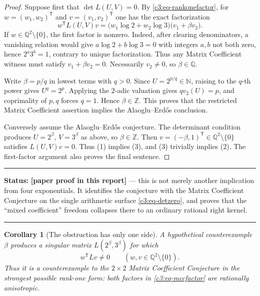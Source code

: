 \documentclass[11pt,oneside]{article}
\newtheorem{corollary}[theorem]{Corollary}
\theoremstyle{definition}
\theoremstyle{remark}
\newcommand{\N}{\mathbb N}
\newcommand{\Z}{\mathbb Z}
\newcommand{\Q}{\mathbb Q}
\newcommand{\statusnew}{\textcolor{newgreen}{\textbf{[paper proof in this report]}}}
\newenvironment{statusbox}[1]
{\begin{center}\begin{minipage}{0.94\textwidth}\raggedright\hbadness=10000\hrule
\vspace{0.45em}\textbf{Status:} #1\par\vspace{0.35em}}
{\vspace{0.35em}\hrule\end{minipage}\end{center}}
\begin{document}
\begin{proof}
Suppose first that $\det L(U,V)=0$.  By \eqref{c3:eq-rankonefactor}, for
$w=(w_1,w_2)^{\mathsf T}$ and $v=(v_1,v_2)^{\mathsf T}$ one has the exact factorization
\begin{equation}
 w^{\mathsf T}L(U,V)v
 =\bigl(w_1\log2+w_2\log3\bigr)\bigl(v_1+\beta v_2\bigr).
 \label{c3:eq-mccfactor}
\end{equation}
If $w\in\Q^2\setminus\{0\}$, the first factor is nonzero.  Indeed, after clearing
denominators, a vanishing relation would give $a\log2+b\log3=0$ with integers $a,b$ not
both zero, hence $2^a3^b=1$, contrary to unique factorization.  Thus any Matrix Coefficient
witness must satisfy $v_1+\beta v_2=0$.  Necessarily $v_2\ne0$, so $\beta\in\Q$.

Write $\beta=p/q$ in lowest terms with $q>0$.  Since $U=2^{p/q}\in\N$, raising to the
$q$-th power gives $U^q=2^p$.  Applying the $2$-adic valuation gives
$qv_2(U)=p$, and coprimality of $p,q$ forces $q=1$.  Hence $\beta\in\Z$.  This proves that the
restricted Matrix Coefficient assertion implies the Alaoglu--Erd\H{o}s conclusion.

Conversely assume the Alaoglu--Erd\H{o}s conjecture.  The determinant condition produces
$U=2^\beta$, $V=3^\beta$ as above, so $\beta\in\Z$.  Then
$v=(-\beta,1)^{\mathsf T}\in\Q^2\setminus\{0\}$ satisfies $L(U,V)v=0$.  Thus (1) implies
(3), and (3) trivially implies (2).  The first-factor argument also proves the final sentence.
\end{proof}

\begin{statusbox}{\statusnew{} --- this is not merely another implication from four
exponentials.  It identifies the conjecture with the Matrix Coefficient Conjecture on the
single arithmetic surface \eqref{c3:eq-detzero}, and proves that the ``mixed coefficient''
freedom collapses there to an ordinary rational right kernel.}
\end{statusbox}

\begin{corollary}[The obstruction has only one side]
\label{c3:cor-one-side}
A hypothetical counterexample $\beta$ produces a singular matrix $L(2^\beta,3^\beta)$ for
which
\[
 w^{\mathsf T}Lv\ne0
 \qquad
 (w,v\in\Q^2\setminus\{0\}).
\]
Thus it is a counterexample to the $2\times2$ Matrix Coefficient Conjecture in the strongest
possible rank-one form: both factors in \eqref{c3:eq-mccfactor} are rationally anisotropic.
\end{corollary}
\end{document}
